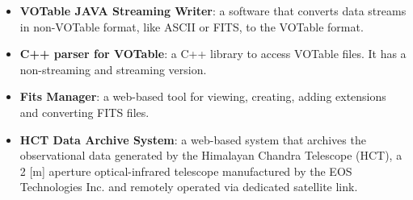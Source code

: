 \begin{itemize}
\item \textbf{VOTable JAVA Streaming Writer}:
a software that converts data streams in non-VOTable format, like ASCII or FITS,
to the VOTable format.

\item \textbf{C++ parser for VOTable}:
a C++ library to access VOTable files. It has a non-streaming and streaming
version.

\item \textbf{Fits Manager}:
a web-based tool for viewing, creating, adding extensions and converting FITS
files.

\item \textbf{HCT Data Archive System}:
a web-based system that archives the observational data generated by the
Himalayan Chandra Telescope (HCT), a 2 [m] aperture optical-infrared telescope
manufactured by the EOS Technologies Inc. and remotely operated via dedicated
satellite link.

\end{itemize}


